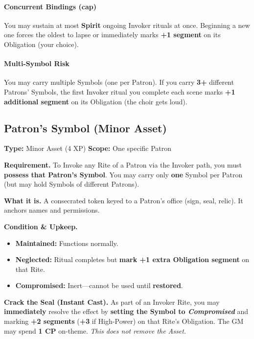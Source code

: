 \documentclass[12pt,twoside]{book}
\begin{document}
\paragraph{Concurrent Bindings (cap)}
You may sustain at most \textbf{Spirit} ongoing Invoker rituals at once. Beginning a new one forces the oldest to lapse or immediately marks \textbf{+1 segment} on its Obligation (your choice).

\paragraph{Multi-Symbol Risk}
You may carry multiple Symbols (one per Patron). If you carry \textbf{3+} different Patrons’ Symbols, the first Invoker ritual you complete each scene marks \textbf{+1 additional segment} on its Obligation (the choir gets loud).


\subsection*{Patron’s Symbol (Minor Asset)}

\textbf{Type:} Minor Asset (4 XP) \hfill \textbf{Scope:} One specific Patron

\textbf{Requirement.} To Invoke any Rite of a Patron via the Invoker path, you must \textbf{possess that Patron’s Symbol}. You may carry only \textbf{one} Symbol per Patron (but may hold Symbols of different Patrons).

\textbf{What it is.} A consecrated token keyed to a Patron’s office (sign, seal, relic). It anchors names and permissions.

\textbf{Condition \& Upkeep.}
\begin{itemize}
  \item \textbf{Maintained:} Functions normally.
  \item \textbf{Neglected:} Ritual completes but \textbf{mark +1 extra Obligation segment} on that Rite.
  \item \textbf{Compromised:} Inert—cannot be used until \textbf{restored}.
\end{itemize}

\textbf{Crack the Seal (Instant Cast).} As part of an Invoker Rite, you may \textbf{immediately} resolve the effect by \textbf{setting the Symbol to \emph{Compromised}} and marking \textbf{+2 segments} (\textbf{+3} if High-Power) on that Rite’s Obligation. The GM may spend \textbf{1 CP} on-theme. \emph{This does not remove the Asset.}
\end{document}
